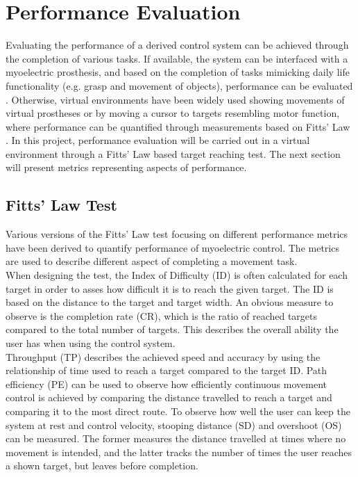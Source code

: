\section{Performance Evaluation}

Evaluating the performance of a derived control system can be achieved through the completion of various tasks. If available, the system can be interfaced with a myoelectric prosthesis, and based on the completion of tasks mimicking daily life functionality (e.g. grasp and movement of objects), performance can be evaluated \cite{Mastinu2018}. Otherwise, virtual environments have been widely used showing movements of virtual prostheses \cite{Powell2014} or by moving a cursor to targets resembling motor function, where performance can be quantified through measurements based on Fitts' Law \cite{Wurth2014,Scheme2013,Hahne2014}. In this project, performance evaluation will be carried out in a virtual environment through a Fitts' Law based target reaching test. The next section will present metrics representing aspects of performance. 

\subsection{Fitts' Law Test}        

Various versions of the Fitts' Law test focusing on different performance metrics have been derived to quantify performance of myoelectric control. The metrics are used to describe different aspect of completing a movement task. \\
When designing the test, the Index of Difficulty (ID) is often calculated for each target in order to asses how difficult it is to reach the given target. The ID is based on the distance to the target and target width.  
An obvious measure to observe is the completion rate (CR), which is the ratio of reached targets compared to the total number of targets. This describes the overall ability the user has when using the control system. \\
Throughput (TP) describes the achieved speed and accuracy by using the relationship of time used to reach a target compared to the target ID. 
Path efficiency (PE) can be used to observe how efficiently continuous movement control is achieved by comparing the distance travelled to reach a target and comparing it to the most direct route. 
To observe how well the user can keep the system at rest and control velocity, stooping distance (SD) and overshoot (OS) can be measured. The former measures the distance travelled at times where no movement is intended, and the latter tracks the number of times the user reaches a shown target, but leaves before completion. \cite{Scheme2013}
